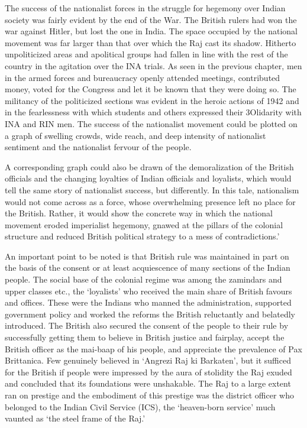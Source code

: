 \begin{multicols}{2}
The success of the nationalist forces in the struggle for hegemony over Indian society was fairly evident by the end of the War. The British rulers had won the war against Hitler, but lost the one in India. The space occupied by the national movement was far larger than that over which the Raj cast its shadow. Hitherto unpoliticized areas and apolitical groups had fallen in line with the rest of the country in the agitation over the INA trials. As seen in the previous chapter, men in the armed forces and bureaucracy openly attended meetings, contributed money, voted for the Congress and let it be known that they were doing so. The militancy of the politicized sections was evident in the heroic actions of 1942 and in the fearlessness with which students and others expressed their 3Olidarity with INA and RIN men. The success of the nationalist movement could be plotted on a graph of swelling crowds, wide reach, and deep intensity of nationalist sentiment and the nationalist fervour of the people. 

A corresponding graph could also be drawn of the demoralization of the British officials and the changing loyalties of Indian officials and loyalists, which would tell the same story of nationalist success, but differently. In this tale, nationalism would not come across as a force, whose overwhelming presence left no place for the British. Rather, it would show the concrete way in which the national movement eroded imperialist hegemony, gnawed at the pillars of the colonial structure and reduced British political strategy to a mess of contradictions.' 

An important point to be noted is that British rule was maintained in part on the basis of the consent or at least acquiescence of many sections of the Indian people. The social base of the colonial regime was among the zamindars and upper classes etc., the `loyalists' who received the main share of British favours and offices. These were the Indians who manned the administration, supported government policy and worked the reforms the British reluctantly and belatedly introduced. The British also secured the consent of the people to their rule by successfully getting them to believe in British justice and fairplay, accept the British officer as the mai-baap of his people, and appreciate the prevalence of Pax Brittanica. Few genuinely believed in `Angrezi Raj ki Barkaten', but it sufficed for the British if people were impressed by the aura of stolidity the Raj exuded and concluded that its foundations were unshakable. The Raj to a large extent ran on prestige and the embodiment of this prestige was the district officer who belonged to the Indian Civil Service (ICS), the `heaven-born service' much vaunted as `the steel frame of the Raj.' 


\end{multicols}
